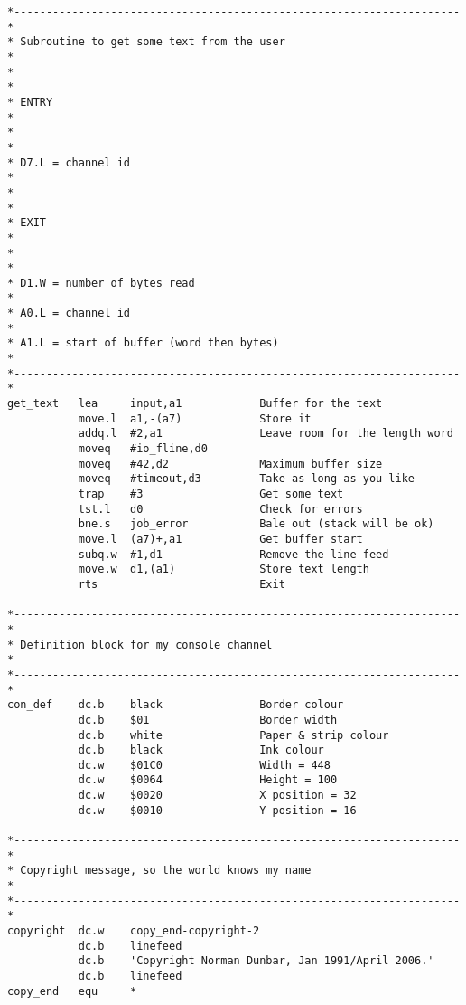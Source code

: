 \begin{lstlisting}[firstnumber=last,caption={Dataspace Program - Part 14 - Various Subroutines}]
*---------------------------------------------------------------------*
* Subroutine to get some text from the user                           *
*                                                                     *
* ENTRY                                                               *
*                                                                     *
* D7.L = channel id                                                   *
*                                                                     *
* EXIT                                                                *
*                                                                     *
* D1.W = number of bytes read                                         *
* A0.L = channel id                                                   *
* A1.L = start of buffer (word then bytes)                            *
*---------------------------------------------------------------------*
get_text   lea     input,a1            Buffer for the text
           move.l  a1,-(a7)            Store it
           addq.l  #2,a1               Leave room for the length word
           moveq   #io_fline,d0
           moveq   #42,d2              Maximum buffer size
           moveq   #timeout,d3         Take as long as you like
           trap    #3                  Get some text
           tst.l   d0                  Check for errors
           bne.s   job_error           Bale out (stack will be ok)
           move.l  (a7)+,a1            Get buffer start
           subq.w  #1,d1               Remove the line feed
           move.w  d1,(a1)             Store text length
           rts                         Exit

*---------------------------------------------------------------------*
* Definition block for my console channel                             *
*---------------------------------------------------------------------*
con_def    dc.b    black               Border colour
           dc.b    $01                 Border width
           dc.b    white               Paper & strip colour
           dc.b    black               Ink colour
           dc.w    $01C0               Width = 448
           dc.w    $0064               Height = 100
           dc.w    $0020               X position = 32
           dc.w    $0010               Y position = 16

*---------------------------------------------------------------------*
* Copyright message, so the world knows my name                       *
*---------------------------------------------------------------------*
copyright  dc.w    copy_end-copyright-2
           dc.b    linefeed
           dc.b    'Copyright Norman Dunbar, Jan 1991/April 2006.'
           dc.b    linefeed
copy_end   equ     *


\end{lstlisting}
